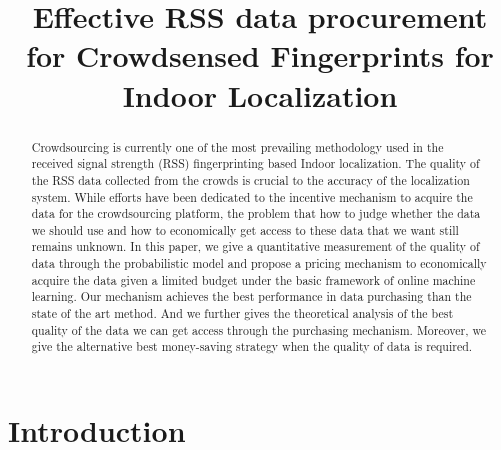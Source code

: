 \documentclass[10pt,conference,compsocconf,letterpaper]{IEEEtran}
\begin{document}
\title{Effective RSS data procurement for Crowdsensed Fingerprints for Indoor Localization}

%
%

\maketitle



\begin{abstract}
Crowdsourcing is currently one of the most prevailing methodology used in the received signal strength (RSS) fingerprinting based Indoor localization. The quality of the RSS data collected from the crowds is crucial to the accuracy of the localization system. While efforts have been dedicated to the incentive mechanism to acquire the data for the crowdsourcing platform, the problem that how to judge whether the data we should use and how to economically get access to these data that we want still remains unknown.  In this paper, we give a quantitative measurement of the quality of data through the probabilistic model and propose a pricing mechanism to economically acquire the data given a limited budget under the basic framework of online machine learning. Our mechanism achieves the best performance in data purchasing than the state of the art method. And we further gives the theoretical analysis of the best quality of the data we can get access through the purchasing mechanism. Moreover, we give the alternative best money-saving strategy when the quality of data is required.
\end{abstract}


\section{Introduction}\label{sectionintro}
\end{document}
